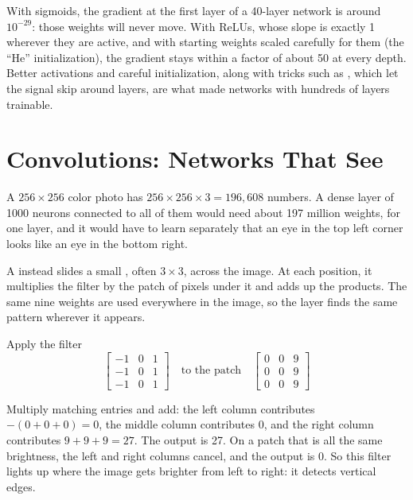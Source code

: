With sigmoids, the gradient at the first layer of a 40-layer network is around $10^{-29}$: those weights will never
move. With ReLUs, whose slope is exactly 1 wherever they are active, and with starting weights scaled carefully
for them (the ``He'' initialization), the gradient stays within a factor of about 50 at every depth. Better
activations and careful initialization, along with tricks such as , which let the
signal skip around layers, are what made networks with hundreds of layers trainable.

\section{Convolutions: Networks That See}
A $256 \times 256$ color photo has $256 \times 256 \times 3 = 196{,}608$ numbers. A dense layer of 1000 neurons
connected to all of them would need about 197 million weights, for one layer, and it would have to learn separately
that an eye in the top left corner looks like an eye in the bottom right.

A  instead slides a small , often
$3 \times 3$, across the image. At each position, it multiplies the filter by the patch of pixels under it and adds
up the products. The same nine weights are used everywhere in the image, so the layer finds the same pattern
wherever it appears.

\begin{Worked}
\begin{Problem}
Apply the filter
$$\begin{bmatrix} -1 & 0 & 1 \\ -1 & 0 & 1 \\ -1 & 0 & 1 \end{bmatrix}
\quad\text{to the patch}\quad
\begin{bmatrix} 0 & 0 & 9 \\ 0 & 0 & 9 \\ 0 & 0 & 9 \end{bmatrix}$$
\end{Problem}
\begin{Solution}
Multiply matching entries and add: the left column contributes $-(0 + 0 + 0) = 0$, the middle
column contributes 0, and the right column contributes $9 + 9 + 9 = 27$. The output is 27. On a patch that is all
the same brightness, the left and right columns cancel, and the output is 0. So this filter lights up where the
image gets brighter from left to right: it detects vertical edges.
\end{Solution}
\end{Worked}

